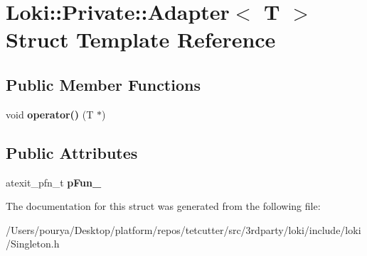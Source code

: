 \hypertarget{structLoki_1_1Private_1_1Adapter}{}\section{Loki\+:\+:Private\+:\+:Adapter$<$ T $>$ Struct Template Reference}
\label{structLoki_1_1Private_1_1Adapter}
\subsection*{Public Member Functions}
\begin{DoxyCompactItemize}
\item 
\hypertarget{structLoki_1_1Private_1_1Adapter_ad5f0c93f36a292340745888a00e62921}{}void {\bfseries operator()} (T $\ast$)\label{structLoki_1_1Private_1_1Adapter_ad5f0c93f36a292340745888a00e62921}

\end{DoxyCompactItemize}
\subsection*{Public Attributes}
\begin{DoxyCompactItemize}
\item 
\hypertarget{structLoki_1_1Private_1_1Adapter_acffe2d1393ce2d0fd82735b2da53d9a7}{}atexit\+\_\+pfn\+\_\+t {\bfseries p\+Fun\+\_\+}\label{structLoki_1_1Private_1_1Adapter_acffe2d1393ce2d0fd82735b2da53d9a7}

\end{DoxyCompactItemize}


The documentation for this struct was generated from the following file\+:\begin{DoxyCompactItemize}
\item 
/\+Users/pourya/\+Desktop/platform/repos/tetcutter/src/3rdparty/loki/include/loki/Singleton.\+h\end{DoxyCompactItemize}
